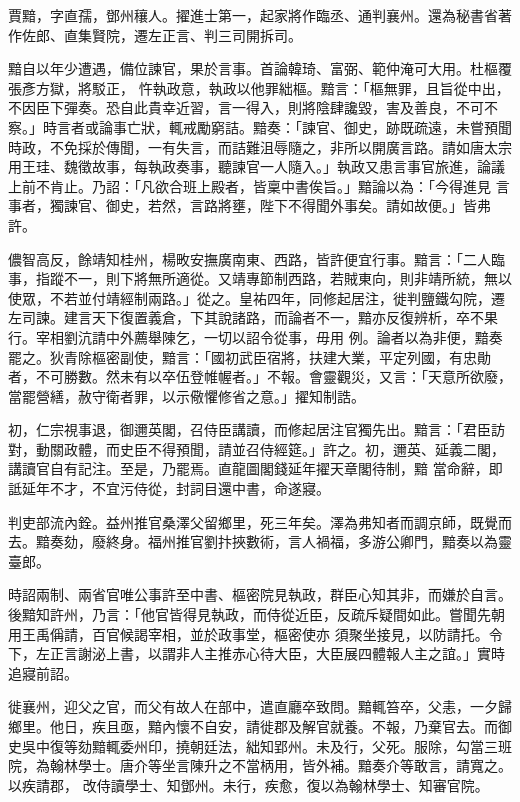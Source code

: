 \begin{pinyinscope}
 賈黯，字直孺，鄧州穰人。擢進士第一，起家將作臨丞、通判襄州。還為秘書省著作佐郎、直集賢院，遷左正言、判三司開拆司。



 黯自以年少遭遇，備位諫官，果於言事。首論韓琦、富弼、範仲淹可大用。杜樞覆張彥方獄，將駁正，
 忤執政意，執政以他罪絀樞。黯言：「樞無罪，且旨從中出，不因臣下彈奏。恐自此貴幸近習，言一得入，則將陰肆讒毀，害及善良，不可不察。」時言者或論事亡狀，輒戒勵窮詰。黯奏：「諫官、御史，跡既疏遠，未嘗預聞時政，不免採於傳聞，一有失言，而詰難沮辱隨之，非所以開廣言路。請如唐太宗用王珪、魏徵故事，每執政奏事，聽諫官一人隨入。」執政又患言事官旅進，論議上前不肯止。乃詔：「凡欲合班上殿者，皆稟中書俟旨。」黯論以為：「今得進見
 言事者，獨諫官、御史，若然，言路將壅，陛下不得聞外事矣。請如故便。」皆弗許。



 儂智高反，餘靖知桂州，楊畋安撫廣南東、西路，皆許便宜行事。黯言：「二人臨事，指蹤不一，則下將無所適從。又靖專節制西路，若賊東向，則非靖所統，無以使眾，不若並付靖經制兩路。」從之。皇祐四年，同修起居注，徙判鹽鐵勾院，遷左司諫。建言天下復置義倉，下其說諸路，而論者不一，黯亦反復辨析，卒不果行。宰相劉沆請中外薦舉陳乞，一切以詔令從事，毋用
 例。論者以為非便，黯奏罷之。狄青除樞密副使，黯言：「國初武臣宿將，扶建大業，平定列國，有忠勛者，不可勝數。然未有以卒伍登帷幄者。」不報。會靈觀災，又言：「天意所欲廢，當罷營繕，赦守衛者罪，以示儆懼修省之意。」擢知制誥。



 初，仁宗視事退，御邇英閣，召侍臣講讀，而修起居注官獨先出。黯言：「君臣訪對，動關政體，而史臣不得預聞，請並召侍經筵。」許之。初，邇英、延義二閣，講讀官自有記注。至是，乃罷焉。直龍圖閣錢延年擢天章閣待制，黯
 當命辭，即詆延年不才，不宜污侍從，封詞目還中書，命遂寢。



 判吏部流內銓。益州推官桑澤父留鄉里，死三年矣。澤為弗知者而調京師，既覺而去。黯奏劾，廢終身。福州推官劉抃挾數術，言人禍福，多游公卿門，黯奏以為靈臺郎。



 時詔兩制、兩省官唯公事許至中書、樞密院見執政，群臣心知其非，而嫌於自言。後黯知許州，乃言：「他官皆得見執政，而侍從近臣，反疏斥疑間如此。嘗聞先朝用王禹偁請，百官候謁宰相，並於政事堂，樞密使亦
 須聚坐接見，以防請托。令下，左正言謝泌上書，以謂非人主推赤心待大臣，大臣展四體報人主之誼。」實時追寢前詔。



 徙襄州，迎父之官，而父有故人在部中，遣直廳卒致問。黯輒笞卒，父恚，一夕歸鄉里。他日，疾且亟，黯內懷不自安，請徙郡及解官就養。不報，乃棄官去。而御史吳中復等劾黯輒委州印，撓朝廷法，絀知郢州。未及行，父死。服除，勾當三班院，為翰林學士。唐介等坐言陳升之不當柄用，皆外補。黯奏介等敢言，請寬之。以疾請郡，
 改侍讀學士、知鄧州。未行，疾愈，復以為翰林學士、知審官院。




\end{pinyinscope}
